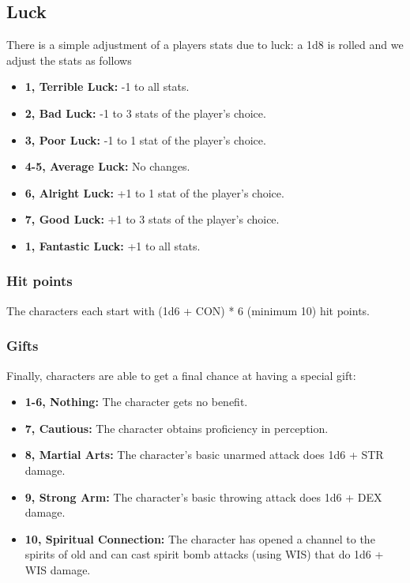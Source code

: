 \documentclass[letterpaper,12pt]{article}
\begin{document}
\subsection{Luck}

There is a simple adjustment of a players stats due to luck: a 1d8 is rolled and we adjust the stats as follows

\begin{itemize}
\item \textbf{1, Terrible Luck:} -1 to all stats.
\item \textbf{2, Bad Luck:} -1 to 3 stats of the player's choice.
\item \textbf{3, Poor Luck:} -1 to 1 stat of the player's choice.
\item \textbf{4-5, Average Luck:} No changes.
\item \textbf{6, Alright Luck:} +1 to 1 stat of the player's choice.
\item \textbf{7, Good Luck:} +1 to 3 stats of the player's choice.
\item \textbf{1, Fantastic Luck:} +1 to all stats.
\end{itemize}

\subsubsection{Hit points}

The characters each start with (1d6 + CON) * 6 (minimum 10) hit points.

\subsubsection{Gifts}

Finally, characters are able to get a final chance at having a special gift:

\begin{itemize}
\item \textbf{1-6, Nothing:} The character gets no benefit.
\item \textbf{7, Cautious:} The character obtains proficiency in perception.
\item \textbf{8, Martial Arts:} The character's basic unarmed attack does 1d6 + STR damage. 
\item \textbf{9, Strong Arm:} The character's basic throwing attack does 1d6 + DEX damage.
\item \textbf{10, Spiritual Connection:} The character has opened a channel to the spirits of old and can cast spirit bomb attacks (using WIS) that do 1d6 + WIS damage.
\end{itemize}
\end{document}
